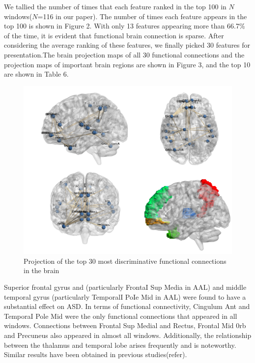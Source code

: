 \documentclass[a4paper]{cas-dc}
\begin{document}
We tallied the number of times that each feature ranked in the top 100 in $N$ windows($N$=116 in our paper). The number of times each feature appears in the top 100 is shown in Figure 2. With only 13 features appearing more than 66.7\% of the time, it is evident that functional brain connection is sparse. After considering the average ranking of these features, we finally picked 30 features for presentation.The brain projection maps of all 30 functional connections and the projection maps of important brain regions are shown in Figure 3, and the top 10 are shown in Table 6.
\begin{figure}[h]
	\centering
	\includegraphics[scale=0.4]{brain.png}
	\caption{Projection of the top 30 most discriminative functional connections in the brain}
\end{figure} 
Superior frontal gyrus and  (particularly FrontaI Sup Media in AAL) and middle temporal gyrus (particularly TemporalI PoIe Mid in AAL) were found to have a substantial effect on ASD. In terms of functional connectivity, Cingulum Ant and TemporaI Pole Mid were the only functional connections that appeared in all windows. Connections between Frontal Sup Medial and Rectus, Frontal Mid 0rb and Precuneus also appeared in almost all windows. Additionally, the relationship between the thalamus and temporal lobe arises frequently and is noteworthy. Similar results have been obtained in previous studies(refer).
\end{document}
